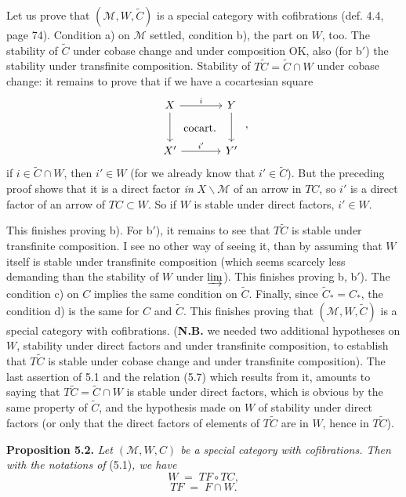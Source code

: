 Let us prove that $(\mathcal{M}, W, \tilde{C})$ is a special category with cofibrations (def. 4.4, page 74). Condition a) on $\mathcal{M}$ settled, condition b), the part on $W$, too. The stability of $\tilde{C}$ under cobase change and under composition OK, also (for b$'$) the stability under transfinite composition. Stability of $T\tilde{C} = \tilde{C} \cap W$ under cobase change: it remains to prove that if we have a cocartesian square
\[
\begin{tikzcd}[row sep=large, column sep=large]
X \arrow[r, "i"] \arrow[d] \arrow[dr, phantom, "\text{cocart.}"] & Y \arrow[d] \\
X' \arrow[r, "i'"] & Y'
\end{tikzcd} \; ,
\]
if $i \in \tilde{C}\cap W$, then $i' \in W$ (for we already know that $i' \in \tilde{C}$). But the preceding proof shows that it is a direct factor \textit{in} $X\backslash\mathcal{M}$ of an arrow in $TC$, so $i'$ is a direct factor of an arrow of $TC \subset W$. So if $W$ is stable under direct factors, $i' \in W$.


This finishes proving b). For b$'$), it remains to see that $T\tilde{C}$ is stable under transfinite composition. I see no other way of seeing it, than by assuming that $W$ itself is stable under transfinite composition (which seems scarcely less demanding than the stability of $W$ under $\varinjlim$). This finishes proving b, b$'$). The condition c) on $C$ implies the same condition on $\tilde{C}$. Finally, since $\tilde{C}_{*} = C_{*}$, the condition d) is the same for $C$ and $\tilde{C}$. This finishes proving that $(\mathcal{M}, W, \tilde{C})$ is a special category with cofibrations. (\textbf{N.B.} we needed two additional hypotheses on $W$, stability under direct factors and under transfinite composition, to establish that $T\tilde{C}$ is stable under cobase change and under transfinite composition). The last assertion of 5.1 and the relation (5.7) which results from it, amounts to saying that $T\tilde{C} = \tilde{C} \cap W$ is stable under direct factors, which is obvious by the same property of $\tilde{C}$, and the hypothesis made on $W$ of stability under direct factors (or only that the direct factors of elements of $T\tilde{C}$ are in $W$, hence in $T\tilde{C}$). %


\textbf{Proposition 5.2.} \textit{Let $(\mathcal{M}, W, C)$ be a special category with cofibrations. Then with the notations of} (5.1)\textit{, we have}
\[
W \;=\; TF \circ TC,
\tag*{(5.8)}
\]
\[
TF \;=\; F \cap W.
\tag*{(5.9)}
\]

